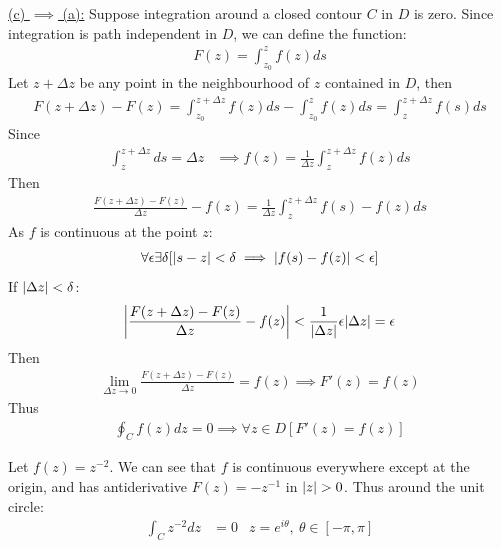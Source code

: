 \documentclass[12pt, english]{book}
\makeatletter
\renewenvironment{proof}[1][\proofname]{\par
	\pushQED{\qed}%
	\normalfont \topsep6\p@\@plus6\p@\relax
	\list{}{%
		\settowidth{\leftmargin}{\itshape\proofname:\hskip\labelsep}%
		\setlength{\labelwidth}{0pt}%
		\setlength{\itemindent}{-\leftmargin}%
		}%
	\item[\hskip\labelsep\itshape#1\@addpunct{:}]\ignorespaces
	}{\popQED\endlist\@endpefalse}
\makeatother
\begin{document}
\begin{proof}
		\underline{(c) \(\implies\) (a):} \newline
		Suppose integration around a closed contour \(C\) in \(D\) is zero. Since integration is path independent in \(D\), we can define the function:
		\begin{align*}
			F(z) = \int_{z_0}^{z} f(z) ds
		\end{align*}
		Let \(z + \Delta z\) be any point in the neighbourhood of \(z\) contained in \(D\), then
		\begin{align*}
			F(z + \Delta z ) - F(z) = \int_{z_0}^{z + \Delta z} f(z) ds - \int_{z_0}^{z} f(z) ds = \int_{z}^{z + \Delta z} f(s) ds
		\end{align*}
		Since
		\begin{align*}
			\int_{z}^{z + \Delta z} ds = \Delta z
			&\implies f(z) = \frac{1}{\Delta z} \int_{z}^{z + \Delta z} f(z) ds 
		\end{align*}
		Then 
		\begin{align*}
			\frac{F(z + \Delta z) - F(z)}{\Delta z} - f(z) 
			= \frac{1}{\Delta z} \int_{z}^{z + \Delta z} f(s) - f(z) ds
		\end{align*}
		As \(f\) is continuous at the point \(z\):
		\begin{align*}
			\forall \epsilon \exists \delta [\abs{s - z} < \delta \implies \abs{f(s) - f(z)} < \epsilon]
		\end{align*}
		If \(\abs{\Delta z}<\delta\):
		\begin{align*}
			\abs{\frac{F(z + \Delta z) - F(z)}{\Delta z} - f(z)} < \frac{1}{\abs{\Delta z}} \epsilon \abs{\Delta z} = \epsilon
		\end{align*}
		Then 
		\begin{align*}
			\lim_{\Delta z \rightarrow 0}
			\frac{F(z + \Delta z) - F(z)}{\Delta z} = f(z) \implies F'(z) = f(z)
		\end{align*}
		Thus
		\begin{align*}
			\oint_{C} f(z) dz = 0 \implies \forall z \in D [F'(z) = f(z)] 
		\end{align*}
	\end{proof}
	
	\begin{example}
		Let \(f(z) = z^{-2}\). We can see that \(f\) is continuous everywhere except at the origin, and has antiderivative \(F(z) = -z^{-1}\) in \(\abs{z}>0\). Thus around the unit circle:
		\begin{align*}
			\int_{C} z^{-2} dz &= 0 & z=e^{i\theta}, \ \theta \in [-\pi, \pi]
		\end{align*}
	\end{example}
\end{document}

